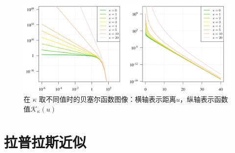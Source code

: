 \documentclass[12pt,a4paper,UTF8,twoside]{book}
\theoremstyle{definition}
\theoremstyle{definition}
\theoremstyle{definition}
\theoremstyle{remark}
\begin{document}
\begin{figure}

{\centering \includegraphics[width=0.7\linewidth]{figures/bessel} 

}

\caption{在 \(\kappa\)
取不同值时的贝塞尔函数图像：横轴表示距离\(u\)，纵轴表示函数值\(\mathcal{K}_{\kappa}(u)\)}\label{fig:bessel-function}
\end{figure}




\hypertarget{sec:Laplace-approximation}{%
\section{拉普拉斯近似}\label{sec:Laplace-approximation}}
\end{document}

